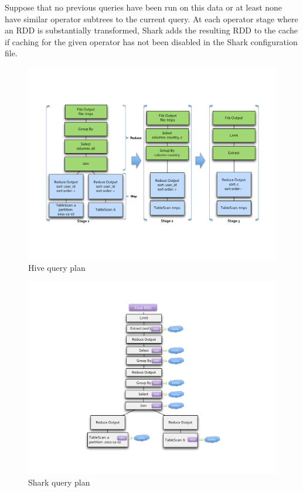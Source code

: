 Suppose that no previous queries have been run on this data or at least none have similar operator subtrees to the current query. At each operator stage where an RDD is substantially transformed, Shark adds the resulting RDD to the cache if caching for the given operator has not been disabled in the Shark configuration file.

\begin{figure}
	\centering
	\includegraphics[width=\linewidth]{files/hive-qplan.pdf}
	\caption{Hive query plan}
	\label{fig:hiveqp}
\end{figure}

\begin{figure}
	\centering
	\includegraphics[width=\linewidth]{files/shark-qplan1.pdf}
	\caption{Shark query plan}
	\label{fig:sharkqp}
\end{figure}

